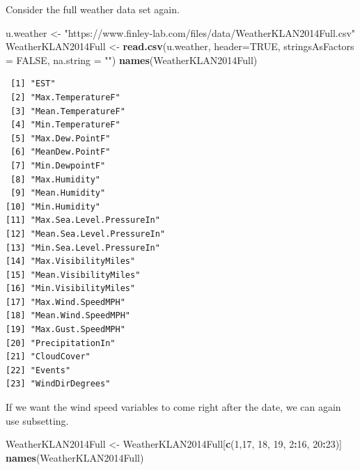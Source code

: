 \documentclass[
]{krantz}
\makeatletter
\newenvironment{Shaded}{\begin{snugshade}}{\end{snugshade}}
\newcommand{\DataTypeTok}[1]{\textcolor[rgb]{0.27,0.27,0.27}{#1}}
\newcommand{\DecValTok}[1]{\textcolor[rgb]{0.06,0.06,0.06}{#1}}
\newcommand{\KeywordTok}[1]{\textcolor[rgb]{0.27,0.27,0.27}{\textbf{#1}}}
\newcommand{\NormalTok}[1]{#1}
\newcommand{\OperatorTok}[1]{\textcolor[rgb]{0.43,0.43,0.43}{\textbf{#1}}}
\newcommand{\OtherTok}[1]{\textcolor[rgb]{0.37,0.37,0.37}{#1}}
\newcommand{\StringTok}[1]{\textcolor[rgb]{0.5,0.5,0.5}{#1}}
\newenvironment{kframe}{%
\medskip{}
\setlength{\fboxsep}{.8em}
 \def\at@end@of@kframe{}%
 \ifinner\ifhmode%
  \def\at@end@of@kframe{\end{minipage}}%
  \begin{minipage}{\columnwidth}%
 \fi\fi%
 \def\FrameCommand##1{\hskip\@totalleftmargin \hskip-\fboxsep
 \colorbox{shadecolor}{##1}\hskip-\fboxsep
     \hskip-\linewidth \hskip-\@totalleftmargin \hskip\columnwidth}%
 \MakeFramed {\advance\hsize-\width
   \@totalleftmargin\z@ \linewidth\hsize
   \@setminipage}}%
 {\par\unskip\endMakeFramed%
 \at@end@of@kframe}
\renewenvironment{Shaded}{\begin{kframe}}{\end{kframe}}
\makeatother
\begin{document}
Consider the full weather data set again.

\begin{Shaded}
\begin{Highlighting}[]
\NormalTok{u.weather \textless{}{-}}\StringTok{ "https://www.finley{-}lab.com/files/data/WeatherKLAN2014Full.csv"}
\NormalTok{WeatherKLAN2014Full \textless{}{-}}\StringTok{ }\KeywordTok{read.csv}\NormalTok{(u.weather, }\DataTypeTok{header=}\OtherTok{TRUE}\NormalTok{, }
                                \DataTypeTok{stringsAsFactors =} \OtherTok{FALSE}\NormalTok{,}
                                \DataTypeTok{na.string =} \StringTok{""}\NormalTok{)}
\KeywordTok{names}\NormalTok{(WeatherKLAN2014Full)}
\end{Highlighting}
\end{Shaded}

\begin{verbatim}
 [1] "EST"                      
 [2] "Max.TemperatureF"         
 [3] "Mean.TemperatureF"        
 [4] "Min.TemperatureF"         
 [5] "Max.Dew.PointF"           
 [6] "MeanDew.PointF"           
 [7] "Min.DewpointF"            
 [8] "Max.Humidity"             
 [9] "Mean.Humidity"            
[10] "Min.Humidity"             
[11] "Max.Sea.Level.PressureIn" 
[12] "Mean.Sea.Level.PressureIn"
[13] "Min.Sea.Level.PressureIn" 
[14] "Max.VisibilityMiles"      
[15] "Mean.VisibilityMiles"     
[16] "Min.VisibilityMiles"      
[17] "Max.Wind.SpeedMPH"        
[18] "Mean.Wind.SpeedMPH"       
[19] "Max.Gust.SpeedMPH"        
[20] "PrecipitationIn"          
[21] "CloudCover"               
[22] "Events"                   
[23] "WindDirDegrees"           
\end{verbatim}

If we want the wind speed variables to come right after the date, we can again use subsetting.

\begin{Shaded}
\begin{Highlighting}[]
\NormalTok{WeatherKLAN2014Full \textless{}{-}}\StringTok{ }\NormalTok{WeatherKLAN2014Full[}\KeywordTok{c}\NormalTok{(}\DecValTok{1}\NormalTok{,}\DecValTok{17}\NormalTok{, }\DecValTok{18}\NormalTok{, }\DecValTok{19}\NormalTok{, }\DecValTok{2}\OperatorTok{:}\DecValTok{16}\NormalTok{, }\DecValTok{20}\OperatorTok{:}\DecValTok{23}\NormalTok{)]}
\KeywordTok{names}\NormalTok{(WeatherKLAN2014Full)}
\end{Highlighting}
\end{Shaded}
\end{document}
